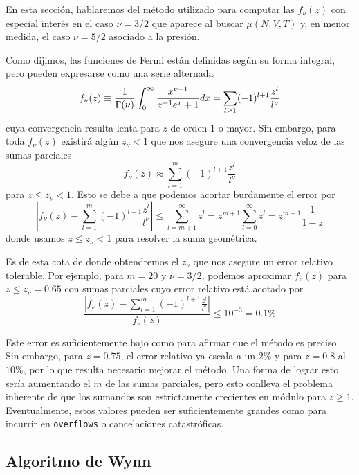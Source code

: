 En esta sección, hablaremos del método utilizado para computar las $f_\nu(z)$ con especial interés en el caso $\nu=3/2$ que aparece al buscar $\mu(N,V,T)$
y, en menor medida, el caso $\nu=5/2$ asociado a la presión.

Como dijimos, las funciones de Fermi están definidas según su forma integral, pero pueden expresarse como una serie alternada
\begin{equation}{\label{eq:fermi_func_serie}}
 f_\nu(z) \equiv \frac{1}{\Gamma(\nu)}\int_0^\infty \frac{x^{\nu-1}}{z^{-1}e^x+1} dx = \sum_{l\geq 1} (-1)^{l+1}\frac{z^l}{l^\nu}
\end{equation}
cuya convergencia resulta lenta para $z$ de orden 1 o mayor.
Sin embargo, para toda $f_\nu(z)$ existirá algún $z_\nu < 1$ que nos asegure una convergencia veloz de las sumas parciales
\[ f_\nu(z) \approx \sum_{l=1}^{m} (-1)^{l+1}\frac{z^l}{l^\nu}\]
para $z\leq z_\nu < 1$.
Esto se debe a que podemos acortar burdamente el error por
\[ \left|f_\nu(z) - \sum_{l=1}^{m}(-1)^{l+1}\frac{z^l}{l^\nu}\right| \leq \sum_{l=m+1}^\infty z^l = z^{m+1}\sum_{l=0}^\infty z^l = z^{m+1} \frac{1}{1-z} \]
donde usamos $z\leq z_\nu < 1$ para resolver la suma geométrica.

Es de esta cota de donde obtendremos el $z_\nu$ que nos asegure un error relativo tolerable.
Por ejemplo, para $m=20$ y $\nu = 3/2$, podemos aproximar $f_\nu(z)$ para $z\leq z_\nu = 0.65$ con sumas parciales cuyo error relativo está acotado por
\[\frac{|f_\nu(z) - \sum_{l=1}^{m}(-1)^{l+1}\frac{z^l}{l^\nu}|}{f_\nu(z)} \leq 10^{-3} = 0.1\%\]

Este error es suficientemente bajo como para afirmar que el método es preciso.
Sin embargo, para $z = 0.75$, el error relativo ya escala a un $2\%$ y para $z=0.8$ al $10\%$, por lo que resulta necesario mejorar el método.
Una forma de lograr esto sería aumentando el $m$ de las sumas parciales, pero esto conlleva el problema inherente de que los sumandos son estrictamente crecientes en módulo para $z\geq 1$.
Eventualmente, estos valores pueden ser suficientemente grandes como para incurrir en \texttt{overflows} o cancelaciones catastróficas.

\subsection{Algoritmo de Wynn}

